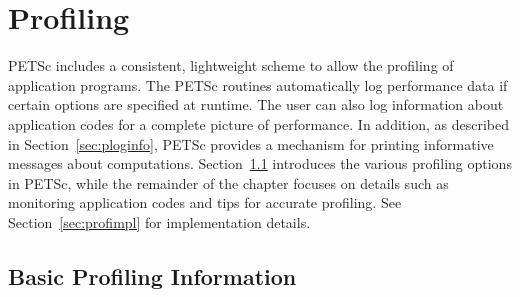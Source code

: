 \chapter{Profiling} 
\label{ch:profiling} 

PETSc includes a consistent, lightweight scheme to allow the profiling
of application programs.  The PETSc routines automatically log
performance data if certain options are specified at runtime.  The
user can also log information about application codes for a complete
picture of performance.  In addition, as described in
Section~\ref{sec:ploginfo}, PETSc provides a mechanism for printing
informative messages about computations.  Section~\ref{sec:profbasic}
introduces the various profiling options in PETSc, while the
remainder of the chapter focuses on details such as monitoring
application codes and tips for accurate profiling.  See
Section~\ref{sec:profimpl} for implementation details.

\section{Basic Profiling Information}
\label{sec:profbasic}
   

